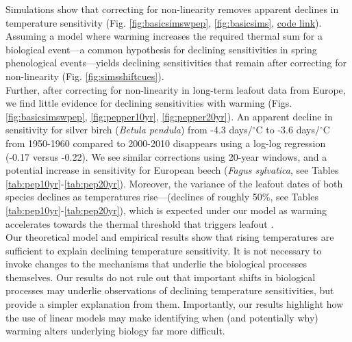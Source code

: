 \documentclass[11pt,letter]{article}
\newcommand{\R}[1]{\label{}\linelabel{#1}} %
\begin{document}
Simulations show that correcting for non-linearity removes apparent declines in temperature sensitivity (Fig. \ref{fig:basicsimswpep}, \ref{fig:basicsims}, \href{https://github.com/temporalecologylab/labgit/tree/master/projects/decsenspost}{code link}). Assuming a model where warming increases the required thermal sum for a biological event---a common hypothesis for declining sensitivities in spring phenological events---yields declining sensitivities that remain after correcting for non-linearity (Fig. \ref{fig:simsshiftcues}). \\

Further, after correcting for non-linearity in long-term leafout data from Europe, we find little evidence for declining sensitivities with warming (Figs. \ref{fig:basicsimswpep}, \ref{fig:pepper10yr}, \ref{fig:pepper20yr}). An apparent decline in sensitivity for silver birch (\emph{Betula pendula}) from -4.3 days/$^{\circ}$C to -3.6 days/$^{\circ}$C from 1950-1960 compared to 2000-2010 disappears using a log-log regression (-0.17 versus -0.22). We see similar corrections using 20-year windows, and a potential increase in sensitivity for European beech (\emph{Fagus sylvatica}, see Tables \ref{tab:pep10yr}-\ref{tab:pep20yr}). Moreover, the variance of the leafout dates of both species declines as temperatures rise---(declines of roughly 50\%, see Tables \ref{tab:pep10yr}-\ref{tab:pep20yr}), which is expected under our model as warming accelerates towards the thermal threshold that triggers leafout \citep[and in contrast to predictions from changing mechanisms, see][]{ford2016}. \\

Our theoretical model and empirical results show that rising temperatures are sufficient to explain declining temperature sensitivity. It is not necessary to invoke changes to the mechanisms that underlie the biological processes themselves. \R{R2biomattersstart} Our results do not rule out that important shifts in biological processes may underlie observations of declining temperature sensitivities, but provide a simpler explanation from them. Importantly, our results highlight how the use of linear models may make identifying when (and potentially why) warming alters underlying biology far more difficult.\R{R2biomattersend}\\

\end{document}

